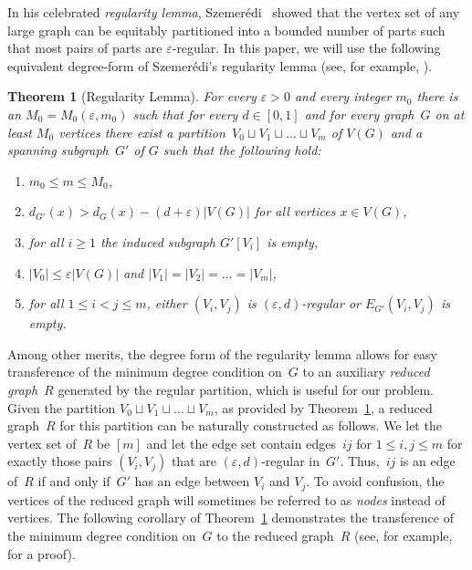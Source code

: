 \documentclass[final]{article}
\def\mcite[#1]#2{\mbox{\cite[#1]{#2}}}
\newtheorem{theorem}{Theorem}[section]
\theoremstyle{definition}
\newcommand{\itmarab}[1]{\mbox{\rm 
({\it #1}\,\arabic{*}\hspace{0.05em})}}
\newcommand{\eps}{\varepsilon}
\begin{document}
In his celebrated \emph{regularity lemma}, Szemer\'{e}di~\cite{Sz_regularity_OG} showed that the vertex set of any large graph can be equitably partitioned into a bounded number of parts such that most pairs of parts are $\eps$-regular. In this paper, we will use the following equivalent degree-form of Szemer\'{e}di's regularity lemma (see, for example, \mcite[Theorem 1.10]{komlos_regularity_survey}).    

\begin{theorem}[Regularity Lemma]
  \label{thm:regularity}
  For every $\eps>0$ and every integer $m_0$ there is an $M_0=M_0(\eps,m_0)$ such that for every $d\in[0,1]$ and for every graph~$G$ on at least $M_0$ vertices there exist a partition~$V_0 \sqcup V_1\sqcup \dots \sqcup V_m$ of $V(G)$ and a spanning subgraph~$G'$ of $G$ such that the following hold:
  \begin{enumerate}[label=\itmarab{RL}]
  \item \label{itm:RL1} $m_0 \leq m \leq M_0$,
  \item \label{itm:RL2} $d_{G'}(x)>d_G(x)-(d+\eps)|V(G)|$ for all vertices $x\in V(G)$,
  \item \label{itm:RL3}for all $i \geq 1$ the induced subgraph $G'[V_i]$ is empty,
  \item \label{itm:RL4} $|V_0|\leq\eps|V(G)|$ and $|V_1|=|V_2|=\dots=|V_m|$,
  \item \label{itm:RL5} for all $1\leq i<j\leq m$, either 
$(V_i,V_j)$ is $(\eps,d)$-regular or $E_{G'}(V_i,V_j)$ is empty.
  \end{enumerate}
\end{theorem}

Among other merits, the degree form of the regularity lemma allows for easy transference of the minimum degree condition on~$G$ to an auxiliary \emph{reduced graph}~$R$ generated by the regular partition, which is useful for our problem. Given the partition $V_0 \sqcup V_1\sqcup\dots\sqcup V_m$, as provided by Theorem~\ref{thm:regularity}, a reduced graph~$R$ for this partition can be naturally constructed as follows. We let the vertex set of~$R$ be $[m]$ and let the edge set contain edges~$ij$ for $1\leq i,j\leq m$ for exactly those pairs $(V_i,V_j)$ that are $(\eps,d)$-regular in~$G'$. Thus,~$ij$ is an edge of~$R$ if and only if~$G'$ has an edge between $V_i$ and $V_j$. To avoid confusion, the vertices of the reduced graph will sometimes be referred to as \emph{nodes} instead of vertices. The following corollary of Theorem~\ref{thm:regularity} demonstrates the transference of the minimum degree condition on~$G$ to the reduced graph~$R$ (see, for example, \mcite[Proposition 9]{kuhn_osthus_planar_subgraph} for a proof).
\end{document}
